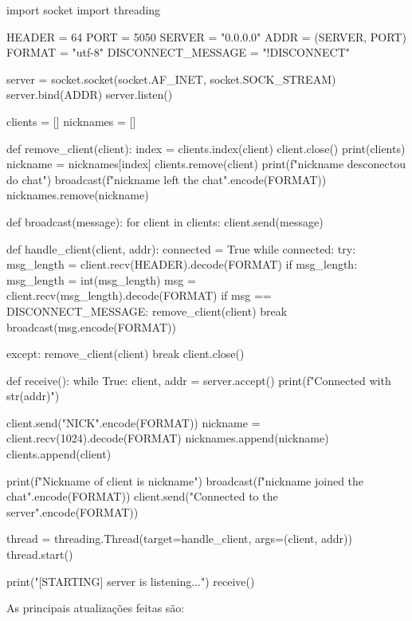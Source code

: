 	\begin{pycode}
		import socket
		import threading
		
		HEADER = 64
		PORT = 5050
		SERVER = "0.0.0.0"
		ADDR = (SERVER, PORT)
		FORMAT = "utf-8"
		DISCONNECT_MESSAGE = "!DISCONNECT"
		
		server = socket.socket(socket.AF_INET, socket.SOCK_STREAM)
		server.bind(ADDR)
		server.listen()
		
		clients = []
		nicknames = []
		
		def remove_client(client):
		index = clients.index(client)
		client.close()
		print(clients)
		nickname = nicknames[index]
		clients.remove(client)
		print(f"{nickname} desconectou do chat")
		broadcast(f"{nickname} left the chat".encode(FORMAT))
		nicknames.remove(nickname)
		
		def broadcast(message):
		for client in clients:
		client.send(message)
		
		def handle_client(client, addr):
		connected = True
		while connected:
		try:
		msg_length = client.recv(HEADER).decode(FORMAT)
		if msg_length:
		msg_length = int(msg_length)
		msg = client.recv(msg_length).decode(FORMAT)
		if msg == DISCONNECT_MESSAGE:
		remove_client(client)
		break
		broadcast(msg.encode(FORMAT))
		
		except:
		remove_client(client)
		break
		client.close()
		
		def receive():
		while True:
		client, addr = server.accept()
		print(f"Connected with {str(addr)}")
		
		client.send("NICK".encode(FORMAT))
		nickname = client.recv(1024).decode(FORMAT)
		nicknames.append(nickname)
		clients.append(client)
		
		print(f"Nickname of client is {nickname}")
		broadcast(f"{nickname} joined the chat".encode(FORMAT))
		client.send("Connected to the server".encode(FORMAT))
		
		thread = threading.Thread(target=handle_client, args=(client, addr))
		thread.start() 
		
		print("[STARTING] server is listening...")
		receive()
	\end{pycode}
	
	As principais atualizações feitas são:
	
